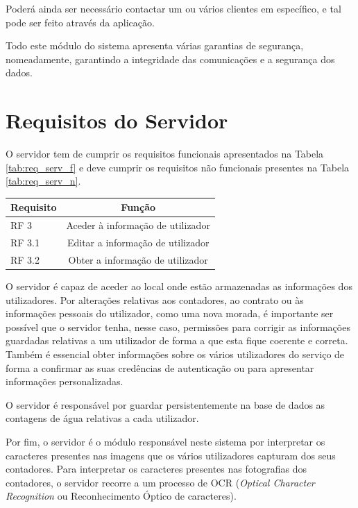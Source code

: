 Poderá ainda ser necessário contactar um ou vários clientes em específico, e tal pode ser feito através da aplicação.\par
Todo este módulo do sistema apresenta várias garantias de segurança, nomeadamente, garantindo a integridade das comunicações e a segurança dos dados.

\section{Requisitos do Servidor} \label{sec:req_servidor}
 
O servidor tem de cumprir os requisitos funcionais apresentados na Tabela \ref{tab:req_serv_f} e deve cumprir os requisitos não funcionais presentes na Tabela \ref{tab:req_serv_n}.

\begin{center}
\begin{tabular}[c]{l c} 
\hline
Requisito & Função\\ %
\hline
RF 3 & Aceder à informação de utilizador\\ 

RF 3.1 & Editar a informação de utilizador\\

RF 3.2 & Obter a informação de utilizador\\
\hline
\end{tabular}
\label{tab:req_serv_f}
\end{center}

O servidor é capaz de aceder ao local onde estão armazenadas as informações dos utilizadores.
Por alterações relativas aos contadores, ao contrato ou às informações pessoais do utilizador, como uma nova morada, é importante ser possível que o servidor tenha, nesse caso, permissões para corrigir as informações guardadas relativas a um utilizador de forma a que esta fique coerente e correta. Também é essencial obter informações sobre os vários utilizadores do serviço de forma a confirmar as suas credências de autenticação ou para apresentar informações personalizadas.\par
O servidor é responsável por guardar persistentemente na base de dados as contagens de água relativas a cada utilizador.\par
Por fim, o servidor é o módulo responsável neste sistema por interpretar os caracteres presentes nas imagens que os vários utilizadores capturam dos seus contadores. Para interpretar os caracteres presentes nas fotografias dos contadores, o servidor recorre a um processo de OCR ({\it{Optical Character Recognition}} ou Reconhecimento Óptico de caracteres).

